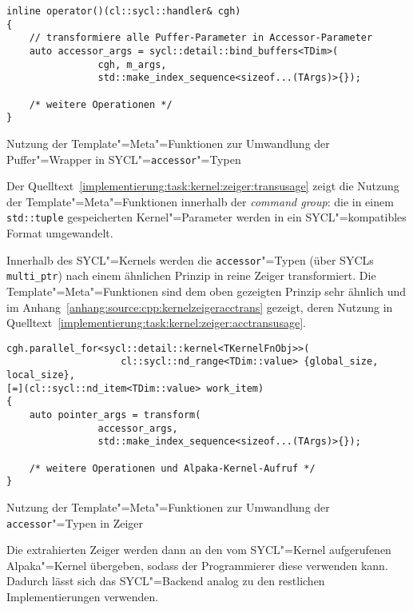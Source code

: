 \begin{code}
    \begin{verbatim}
inline operator()(cl::sycl::handler& cgh)
{
    // transformiere alle Puffer-Parameter in Accessor-Parameter
    auto accessor_args = sycl::detail::bind_buffers<TDim>(
                cgh, m_args,
                std::make_index_sequence<sizeof...(TArgs)>{});

    /* weitere Operationen */
}
    \end{verbatim}
    \caption{Nutzung der Template"=Meta"=Funktionen zur Umwandlung der
             Puffer"=Wrapper in SYCL"=\texttt{accessor}"=Typen}
    \label{implementierung:task:kernel:zeiger:transusage}
\end{code}

Der Quelltext~\ref{implementierung:task:kernel:zeiger:transusage} zeigt die
Nutzung der Template"=Meta"=Funktionen innerhalb der \textit{command group}:
die in einem \texttt{std::tuple} gespeicherten Kernel"=Parameter werden in ein
SYCL"=kompatibles Format umgewandelt.

Innerhalb des SYCL"=Kernels werden die \texttt{accessor}"=Typen (über SYCLs
\texttt{multi\_ptr}) nach einem ähnlichen Prinzip in reine Zeiger transformiert.
Die Template"=Meta"=Funktionen sind dem oben gezeigten Prinzip sehr ähnlich
und im Anhang~\ref{anhang:source:cpp:kernelzeigeracctrans} gezeigt, deren
Nutzung in Quelltext~\ref{implementierung:task:kernel:zeiger:acctransusage}.

\begin{code}
    \begin{verbatim}
cgh.parallel_for<sycl::detail::kernel<TKernelFnObj>>(
                    cl::sycl::nd_range<TDim::value> {global_size, local_size},
[=](cl::sycl::nd_item<TDim::value> work_item)
{
    auto pointer_args = transform(
                accessor_args,
                std::make_index_sequence<sizeof...(TArgs)>{});

    /* weitere Operationen und Alpaka-Kernel-Aufruf */
}
    \end{verbatim}
    \caption{Nutzung der Template"=Meta"=Funktionen zur Umwandlung der
             \texttt{accessor}"=Typen in Zeiger}
    \label{implementierung:task:kernel:zeiger:acctransusage}
\end{code}

Die extrahierten Zeiger werden dann an den vom SYCL"=Kernel aufgerufenen
Alpaka"=Kernel übergeben, sodass der Programmierer diese verwenden kann.
Dadurch lässt sich das SYCL"=Backend analog zu den restlichen Implementierungen
verwenden.

